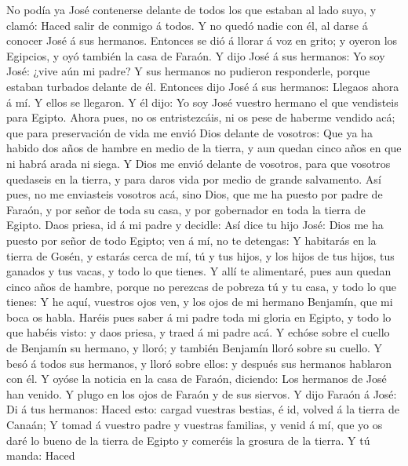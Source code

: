  No podía ya José contenerse delante de todos los que
estaban al lado suyo, y clamó: Haced salir de conmigo á todos. Y no
quedó nadie con él, al darse á conocer José á sus hermanos.
 Entonces se dió á llorar á voz en grito; y oyeron los
Egipcios, y oyó también la casa de Faraón.  Y dijo José á
sus hermanos: Yo soy José: ¿vive aún mi padre? Y sus hermanos no
pudieron responderle, porque estaban turbados delante de él.
 Entonces dijo José á sus hermanos: Llegaos ahora á mí. Y
ellos se llegaron. Y él dijo: Yo soy José vuestro hermano el que
vendisteis para Egipto.  Ahora pues, no os entristezcáis,
ni os pese de haberme vendido acá; que para preservación de vida me
envió Dios delante de vosotros:  Que ya ha habido dos años
de hambre en medio de la tierra, y aun quedan cinco años en que ni habrá
arada ni siega.  Y Dios me envió delante de vosotros, para
que vosotros quedaseis en la tierra, y para daros vida por medio de
grande salvamento.  Así pues, no me enviasteis vosotros
acá, sino Dios, que me ha puesto por padre de Faraón, y por señor de
toda su casa, y por gobernador en toda la tierra de Egipto.
 Daos priesa, id á mi padre y decidle: Así dice tu hijo
José: Dios me ha puesto por señor de todo Egipto; ven á mí, no te
detengas:  Y habitarás en la tierra de Gosén, y estarás
cerca de mí, tú y tus hijos, y los hijos de tus hijos, tus ganados y tus
vacas, y todo lo que tienes.  Y allí te alimentaré, pues
aun quedan cinco años de hambre, porque no perezcas de pobreza tú y tu
casa, y todo lo que tienes:  Y he aquí, vuestros ojos
ven, y los ojos de mi hermano Benjamín, que mi boca os habla.
 Haréis pues saber á mi padre toda mi gloria en Egipto, y
todo lo que habéis visto: y daos priesa, y traed á mi padre acá.
 Y echóse sobre el cuello de Benjamín su hermano, y
lloró; y también Benjamín lloró sobre su cuello.  Y besó
á todos sus hermanos, y lloró sobre ellos: y después sus hermanos
hablaron con él.  Y oyóse la noticia en la casa de
Faraón, diciendo: Los hermanos de José han venido. Y plugo en los ojos
de Faraón y de sus siervos.  Y dijo Faraón á José: Di á
tus hermanos: Haced esto: cargad vuestras bestias, é id, volved á la
tierra de Canaán;  Y tomad á vuestro padre y vuestras
familias, y venid á mí, que yo os daré lo bueno de la tierra de Egipto y
comeréis la grosura de la tierra.  Y tú manda: Haced
